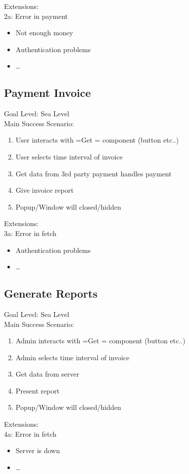 \documentclass[11pt]{article}
\begin{document}
Extensions:  \\
2a: Error in payment
\begin{itemize}
\item Not enough money
\item Authentication problems
\item \ldots{}
\end{itemize}
\subsection{Payment Invoice}
\label{sec:orgc53bd01}
Goal Level: Sea Level \\
Main Success Scenario: \\

\begin{enumerate}
\item User interacts with =Get = component (button etc..)
\item User selects time interval of invoice
\item Get data from 3rd party payment handles payment
\item Give invoice report
\item Popup/Window will closed/hidden
\end{enumerate}

Extensions:  \\
3a: Error in fetch
\begin{itemize}
\item Authentication problems
\item \ldots{}
\end{itemize}
\subsection{Generate Reports}
\label{sec:org36b71b7}
Goal Level: Sea Level \\
Main Success Scenario: \\

\begin{enumerate}
\item Admin interacts with =Get = component (button etc..)
\item Admin selects time interval of invoice
\item Get data from server
\item Present report
\item Popup/Window will closed/hidden
\end{enumerate}

Extensions:  \\
4a: Error in fetch
\begin{itemize}
\item Server is down
\item \ldots{}
\end{itemize}
\end{document}
